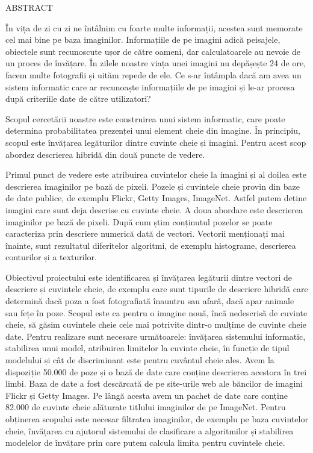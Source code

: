 \documentclass[12pt, a4paper, oneside]{book}
\theoremstyle{tetel}
\begin{document}
\newpage
\thispagestyle{empty}
\begin{center}
    \Large ABSTRACT
\end{center}

	În vița de zi cu zi ne întâlnim cu foarte multe informații, acestea sunt memorate cel mai bine pe baza imaginilor. Informațiile de pe imagini adică peisajele, obiectele sunt recunoscute ușor de către oameni, dar calculatoarele au nevoie de un proces de învățare. În zilele noastre viața unei imagini nu depășește 24 de ore, facem multe fotografii și uităm repede de ele. Ce s-ar întâmpla dacă am avea un sistem informatic care ar recunoaște informațiile de pe imagini și le-ar procesa după criteriile date de către utilizatori?

	Scopul cercetării noastre este construirea unui sistem informatic, care poate determina probabilitatea prezenței unui element cheie din imagine. În principiu, scopul este învățarea legăturilor dintre cuvinte cheie și imagini. Pentru acest scop abordez descrierea hibridă din două puncte de vedere.

	Primul punct de vedere este atribuirea cuvintelor cheie la imagini și al doilea este descrierea imaginilor pe bază de pixeli.  Pozele și cuvintele cheie provin din baze de date publice, de exemplu Flickr\cite{1}, Getty Images\cite{2}, ImageNet\cite{3}. Astfel putem deține imagini care sunt deja descrise cu cuvinte cheie. A doua abordare este descrierea imaginilor pe bază de pixeli. După cum știm conținutul pozelor se poate caracteriza prin descriere numerică dată de vectori. Vectorii menționați mai înainte, sunt rezultatul diferitelor algoritmi, de exemplu histograme, descrierea conturilor și a texturilor.

	Obiectivul proiectului este identificarea și învățarea legăturii dintre vectori de descriere și cuvintele cheie, de exemplu care sunt tipurile de descriere hibridă care determină dacă poza a fost fotografiată înauntru sau afară, dacă apar animale sau fețe în poze. Scopul este ca pentru o imagine nouă, încă nedescrisă de cuvinte cheie, să găsim cuvintele cheie cele mai potrivite dintr-o mulțime de cuvinte cheie date. Pentru realizare sunt necesare următoarele: învățarea sistemului informatic, stabilirea unui model, atribuirea limitelor la cuvinte cheie, în funcție de tipul modelului și cât de discriminant este pentru cuvântul cheie ales. Avem la dispoziție 50.000 de poze și o bază de date care conține descrierea acestora în trei limbi. Baza de date a fost descărcată de pe site-urile web ale băncilor de imagini Flickr\cite{1} și Getty Images\cite{2}. Pe lângă acesta avem un pachet de date care conține 82.000 de cuvinte cheie alăturate titlului imaginilor de pe ImageNet\cite{3}. Pentru obținerea scopului este necesar filtratea imaginilor, de exemplu pe baza cuvintelor cheie, învățarea cu ajutorul sistemului de clasificare a algoritmilor și stabilirea modelelor de învățare prin care putem calcula limita pentru cuvintele cheie.
\end{document}
